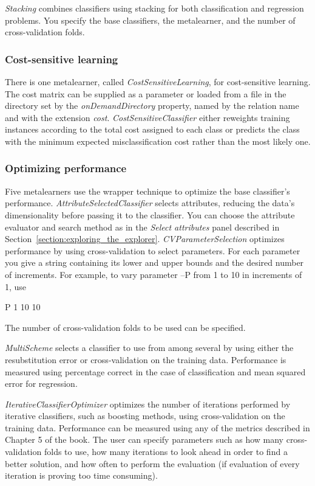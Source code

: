 {\em Stacking} combines classifiers using stacking for both classification
and regression problems. You specify the base classifiers, the
metalearner, and the number of cross-validation folds.

\subsubsection{Cost-sensitive learning}

There is one metalearner, called \textit{CostSensitiveLearning}, for
cost-sensitive learning. The cost matrix can be supplied as a
parameter or loaded from a file in the directory set by the
\textit{onDemandDirectory} property, named by the relation name and
with the extension {\em cost}. \textit{CostSensitiveClassifier} either
reweights training instances according to the total cost assigned to
each class or predicts the class with the minimum expected
misclassification cost rather than the most likely one.

\subsubsection{Optimizing performance}

Five metalearners use the wrapper technique to optimize the base
classifier's performance. \textit{AttributeSelectedClassifier} selects
attributes, reducing the data's dimensionality before passing it to
the classifier. You can choose the attribute evaluator and search
method as in the {\em Select attributes} panel described in
Section~\ref{section:exploring_the_explorer}. \textit{CVParameterSelection}
optimizes performance by using cross-validation to select
parameters. For each parameter you give a string containing its lower
and upper bounds and the desired number of increments. For example, to
vary parameter --P from 1 to 10 in increments of 1, use\newline

P 1 10 10\newline

The number of cross-validation folds to be used can be specified.

\textit{MultiScheme} selects a classifier to use from among several by
using either the resubstitution error or cross-validation on the
training data. Performance is measured using percentage correct in the
case of classification and mean squared error for regression.

\textit{IterativeClassifierOptimizer} optimizes the number of iterations
performed by iterative classifiers, such as boosting methods, using
cross-validation on the training data. Performance can be measured
using any of the metrics described in Chapter 5 of the book. The user can specify
parameters such as how many cross-validation folds to use, how many
iterations to look ahead in order to find a better solution, and how
often to perform the evaluation (if evaluation of every iteration is
proving too time consuming).

